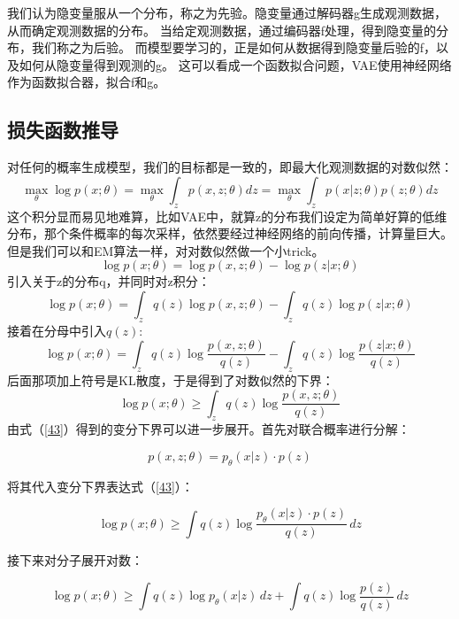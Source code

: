 \documentclass[12pt,a4paper]{article}
\begin{document}
我们认为隐变量服从一个分布，称之为先验。隐变量通过解码器g生成观测数据，从而确定观测数据的分布。
当给定观测数据，通过编码器f处理，得到隐变量的分布，我们称之为后验。
而模型要学习的，正是如何从数据得到隐变量后验的f，以及如何从隐变量得到观测的g。
这可以看成一个函数拟合问题，VAE使用神经网络作为函数拟合器，拟合f和g。
\subsection{损失函数推导}
对任何的概率生成模型，我们的目标都是一致的，即最大化观测数据的对数似然：
\begin{equation}
    \max_\theta \log p(x;\theta)=\max_\theta  \int_z p(x,z;\theta)dz=\max_\theta  \int_z p(x|z;\theta)p(z;\theta)dz
\end{equation}
这个积分显而易见地难算，比如VAE中，就算z的分布我们设定为简单好算的低维分布，那个条件概率的每次采样，依然要经过神经网络的前向传播，计算量巨大。
但是我们可以和EM算法一样，对对数似然做一个小trick。
\begin{equation}
  \log p(x;\theta)=\log p(x,z;\theta)-\log p(z|x;\theta)
\end{equation}
引入关于z的分布q，并同时对z积分：
\begin{equation}
  \log p(x;\theta)=\int_z q(z)\log p(x,z;\theta)-\int_z q(z)\log p(z|x;\theta)
\end{equation}
接着在分母中引入$q(z)$:
\begin{equation}
  \log p(x;\theta)=\int_z q(z)\log \frac{p(x,z;\theta)}{q(z)}-\int_z q(z)\log \frac{p(z|x;\theta)}{q(z)}
\end{equation}
后面那项加上符号是KL散度，于是得到了对数似然的下界：
\begin{equation}\label{43}
    \log p(x;\theta)\geq \int_z q(z)\log \frac{p(x,z;\theta)}{q(z)}
\end{equation}
\newpage
由式（\ref{43}）得到的变分下界可以进一步展开。首先对联合概率进行分解：

\begin{equation}
p(x, z; \theta) = p_\theta(x|z) \cdot p(z) \label{44}
\end{equation}

将其代入变分下界表达式（\ref{43}）：

\begin{equation}
\log p(x; \theta) \geq \int q(z) \log \frac{p_\theta(x|z) \cdot p(z)}{q(z)} \, dz \label{45}
\end{equation}

接下来对分子展开对数：

\begin{equation}
\log p(x; \theta) \geq \int q(z) \log p_\theta(x|z) \, dz + \int q(z) \log \frac{p(z)}{q(z)} \, dz \label{46}
\end{equation}
\end{document}
